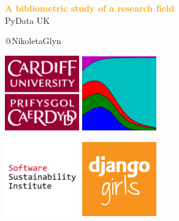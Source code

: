 \documentclass{beamer}
\begin{document}
\begin{frame}
    \begin{center}
        \LARGE{\textbf{\textcolor{orange}{A bibliometric study of a research field}}} \\

        \vspace{1.5cm}
        \normalsize{PyData UK}

        \vspace{1cm}
        \normalsize{@NikoletaGlyn}

    \end{center}
\end{frame}

\begin{frame}
    \begin{center}
    \includegraphics[width=0.24\textwidth]{static/cardiff_uni_logo.png}\hspace{6pt}
    \includegraphics[width=0.24\textwidth, height=0.245\textwidth]{static/axelrod-logo.png}\vspace{10pt}

    \includegraphics[width=0.24\textwidth]{static/ssi-logo.png} \hspace{6pt}
    \includegraphics[width=0.24\textwidth]{static/django_girls.png}

    \end{center}
\end{frame}
\end{document}

